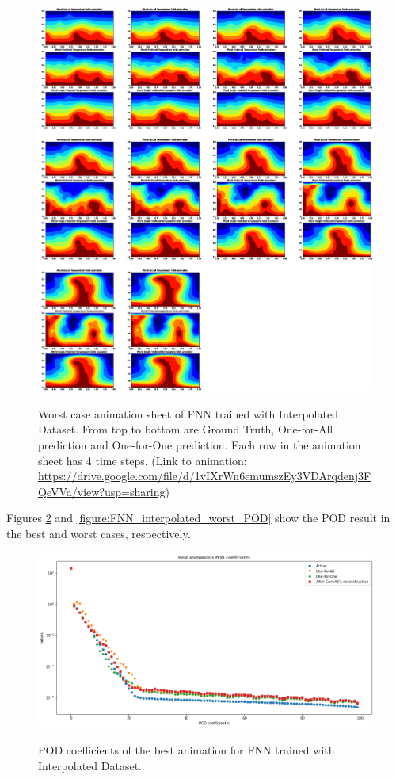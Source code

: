 \begin{figure}[H]
    \centering
    \caption{Worst case animation sheet of FNN trained with Interpolated Dataset. From top to bottom are Ground Truth, One-for-All prediction and One-for-One prediction. Each row in the animation sheet has 4 time steps. (Link to animation: \url{https://drive.google.com/file/d/1vIXrWn6emumszEy3VDArqdenj3FQeVVa/view?usp=sharing})}
    \includegraphics[scale=0.23]{figures/mantle_convection_images/larger_dataset_interpolated/FNN_Worst_GIF_sheet.png}
    \label{figure:FNN_interpolated_worst_gif}
\end{figure}

Figures \ref{figure:FNN_interpolated_best_POD} and \ref{figure:FNN_interpolated_worst_POD} show the POD result in the best and worst cases, respectively.

\begin{figure}[H]
    \centering
    \caption{POD coefficients of the best animation for FNN trained with Interpolated Dataset.}
    \includegraphics[scale=0.4]{figures/mantle_convection_images/larger_dataset_interpolated/FNN_Best_POD.png}
    \label{figure:FNN_interpolated_best_POD}
\end{figure}

